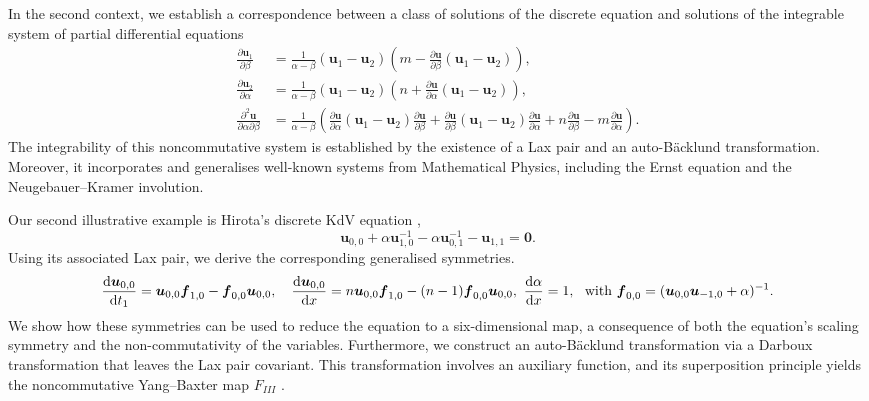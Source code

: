 \documentclass[dvips,10pt]{article}
\newcommand{\bs}{\boldsymbol}
\newcommand{\bsu}{ {\bs{u}}}
\newcommand{\bsf}{ {\bs{f}}}
\theoremstyle{remark} %
\begin{document}
	In the second context, we establish a correspondence between a class of solutions of the discrete equation and solutions of the integrable system of partial differential equations
	\begin{align*}
	\frac{\partial {\bs{u}}_{1}}{\partial \beta} &= \frac{1}{\alpha-\beta} \left({\bs{u}}_{1} -{\bs{u}}_{2}\right) \left(m - \frac{\partial {\bs{u}}}{\partial \beta}  \left( {\bs{u}}_{1} -{\bs{u}}_{2} \right)\right), \nonumber \\
	\frac{\partial {\bs{u}}_{2}}{\partial \alpha} &=\frac{1}{\alpha-\beta} \left({\bs{u}}_{1} -{\bs{u}}_{2}\right) \left(n+ \frac{\partial {\bs{u}}}{\partial \alpha}  \left( {\bs{u}}_{1} -{\bs{u}}_{2} \right)\right),  \\
	\frac{\partial^2 {\bs{u}}}{\partial \alpha \partial \beta} &= \frac{1}{\alpha-\beta} \left(  \frac{\partial {\bs{u}}}{\partial \alpha} \left({\bs{u}}_{1} -{\bs{u}}_{2}\right)  \frac{\partial {\bs{u}}}{\partial \beta} + \frac{\partial {\bs{u}}}{\partial \beta} \left({\bs{u}}_{1} -{\bs{u}}_{2}\right)  \frac{\partial {\bs{u}}}{\partial \alpha} + n \frac{\partial {\bs{u}}}{\partial \beta} -  m \frac{\partial {\bs{u}}}{\partial \alpha} \right). \nonumber
	\end{align*}
	The integrability of this noncommutative system is established by the existence of a Lax pair and an auto-B\"acklund transformation. Moreover, it incorporates and generalises well-known systems from Mathematical Physics, including the Ernst equation and the Neugebauer–Kramer involution.
	
	Our second illustrative example is Hirota's discrete KdV equation \cite{Betal},
	\begin{equation*} 
		{\bs{u}}_{0,0} + \alpha {\bs{u}}_{1,0}^{-1} - \alpha {\bs{u}}_{0,1}^{-1}-{\bs{u}}_{1,1} = {\bs{0}}.
	\end{equation*}
	Using its associated Lax pair, we derive the corresponding generalised symmetries. 
	$$\frac{{\rm{d}} {\bs{u}}_{0,0}}{{\rm{d}} t_1} =  {\bs{u}}_{0,0} {\bs{f}}_{1,0} -{\bs{f}}_{0,0}  {\bs{u}}_{0,0},~~~ \frac{{\rm{d}} {\bs{u}}_{0,0}}{{\rm{d}} x} =  n {\bs{u}}_{0,0} {\bs{f}}_{1,0} -(n-1) {\bs{f}}_{0,0}  {\bs{u}}_{0,0}, ~ 	\frac{{\rm{d}} \alpha}{{\rm{d}} x} = 1,~~ {\mbox{with }} \bsf_{0,0} = (\bsu_{0,0} \bsu_{-1,0}+\alpha)^{-1}.$$
	We show how these symmetries can be used to reduce the equation to a six-dimensional map, a consequence of both the equation's scaling symmetry and the non-commutativity of the variables. Furthermore, we construct an auto-B\"acklund transformation via a Darboux transformation that leaves the Lax pair covariant. This transformation involves an auxiliary function, and its superposition principle yields the noncommutative Yang--Baxter map $F_{III}$ \cite{Dol}.
	
\end{document}

